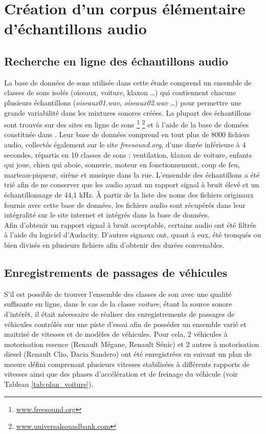 \section{Création d'un corpus élémentaire d'échantillons audio}

\subsection{Recherche en ligne des échantillons audio}

La base de données de sons utilisée dans cette étude comprend un ensemble de classes de sons isolés (oiseaux, voiture, klaxon  \dots) qui contiennent chacune plusieurs échantillons (\textit{oiseaux01.wav}, \textit{oiseaux02.wav} \dots) pour permettre une grande variabilité dans les mixtures sonores créées. La plupart des échantillons sont trouvés sur des sites en ligne de sons \footnote{\url{www.freesound.org}} \footnote{\url{www.universalsoundbank.com}} et à l'aide de la base de données constituée dans  \cite{salamon_dataset_nodate}. Leur base de données comprend en tout plus de 8000 fichiers audio, collectés également sur le site \textit{freesound.org}, d'une durée inférieure à 4 secondes, répartis en 10 classes de sons : ventilation, klaxon de voiture, enfants qui joue, chien qui aboie, sonnerie, moteur en fonctionnement, coup de feu, marteau-piqueur, sirène et musique dans la rue. L'ensemble des échantillons a été trié afin de ne conserver que les audio ayant un rapport signal à bruit élevé et un échantillonnage de 44,1 kHz. \`A partir de la liste des noms des fichiers originaux fournis avec cette base de données, les fichiers audio sont récupérés dans leur intégralité sur le site internet et intégrés dans la base de données.\\
Afin d'obtenir un rapport signal à bruit acceptable, certains audio ont été filtrés à l'aide du logiciel d'Audacity. D'autres signaux ont, quant à eux, été tronqués ou bien divisés en plusieurs fichiers afin d'obtenir des durées convenables.

\subsection{Enregistrements de passages de véhicules}\label{part:voiture_record}
S'il est possible de trouver l'ensemble des classes de son avec une qualité suffisante en ligne, dans le cas de la classe \textit{voiture}, étant la source sonore d'intérêt, il était nécessaire de réaliser des enregistrements de passages de véhicules contrôlés sur une piste d'essai afin de posséder un ensemble varié et maitrisé de vitesses et de modèles de véhicules. Pour cela, 2 véhicules à motorisation essence (Renault Mégane, Renault Sénic) et 2 autres à motorisation diesel (Renault Clio, Dacia Sandero) ont été enregistrées en suivant un plan de mesure défini comprenant plusieurs vitesses stabilisées à différents rapports de vitesses ainsi que des phases d'accélération et de freinage du véhicule (voir Tableau \ref{tab:plan_voiture}).

